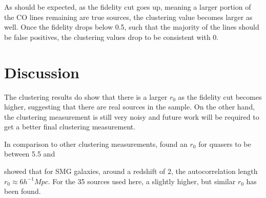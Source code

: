 As should be expected, as the fidelity cut goes up, meaning a larger portion of the CO lines remaining are true sources, the clustering value becomes larger as well. Once the fidelity drops below 0.5, such that the majority of the lines should be false positives, the clustering values drop to be consistent with 0.

\section{Discussion}

The clustering results do show that there is a larger $r_0$ as the fidelity cut becomes higher, suggesting that there are real sources in the sample. On the other hand, the clustering measurement is still very noisy and future work will be required to get a better final clustering measurement. 

In comparison to other clustering measurements, \cite{hickox2011clustering} found an $r_0$ for quasers to be between 5.5 and 

\cite{hickox2011clustering} showed that for SMG galaxies, around a redshift of 2, the autocorrelation length $r_0 \approx 6 h^{-1} Mpc$. For the 35 sources used here, a slightly higher, but similar $r_0$ has been found. 

